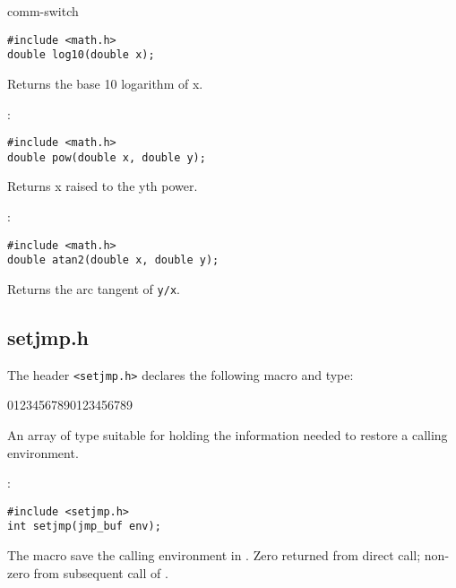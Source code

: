 \begin{Ventry2}{comm-switch  }
\begin{production}
\begin{verbatim}
#include <math.h>
double log10(double x);
\end{verbatim}
\end{production}


Returns the base 10 logarithm of x.

\item[pow]
\label{item:pow}
:

\begin{production}
\begin{verbatim}
#include <math.h>
double pow(double x, double y);
\end{verbatim}
\end{production}


Returns x raised to the yth power.

\item[atan2]
\label{item:atan2}
:

\begin{production}
\begin{verbatim}
#include <math.h>
double atan2(double x, double y);
\end{verbatim}
\end{production}


Returns the arc tangent of \verb+y/x+.


\end{Ventry2}



\subsection{setjmp.h}
\label{sec:setjmph}

The header \verb+<setjmp.h>+ declares the following macro and type:


\begin{Ventry2}{01234567890123456789 }

\item[jmp\_buf]
\label{item:jmpbuf}
     An array of type suitable for holding the information needed to restore a calling
environment.

\item[setjmp]
\label{item:setjmp}
:
\begin{production}
\begin{verbatim}
#include <setjmp.h>
int setjmp(jmp_buf env);
\end{verbatim}
\end{production}

     The  macro save the calling environment in 
     . Zero returned from direct call; non-zero from subsequent
     call of .

\end{Ventry2}



